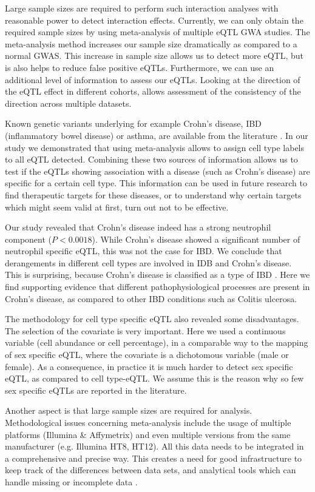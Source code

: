 Large sample sizes are required to perform such interaction analyses with reasonable power to detect interaction effects. Currently, we can only 
obtain the required sample sizes by using meta-analysis of multiple eQTL GWA studies. The meta-analysis method increases our sample size dramatically 
as compared to a normal GWAS. This increase in sample size allows us to detect more eQTL, but is also helps to reduce false positive eQTLs. Furthermore, 
we can use an additional level of information to assess our eQTLs. Looking at the direction of the eQTL effect in different cohorts, allows assessment 
of the consistency of the direction across multiple datasets. 

Known genetic variants underlying for example Crohn's disease, IBD (inflammatory bowel disease) or asthma, are available from the literature 
\cite{Hindorff:2009}. In our study we demonstrated that using meta-analysis allows to assign cell type labels to all eQTL detected. Combining 
these two sources of information allows us to test if the eQTLs showing association with a disease (such as Crohn's disease) are specific for a 
certain cell type. This information can be used in future research to find therapeutic targets for these diseases, or to understand why certain 
targets which might seem valid at first, turn out not to be effective.

Our study revealed that Crohn's disease indeed has a strong neutrophil component ($P < 0.0018$). While Crohn's disease showed a significant number of 
neutrophil specific eQTL, this was not the case for IBD. We conclude that derangements in different cell types are involved in IDB and Crohn's disease. 
This is surprising, because Crohn's disease is classified as a type of IBD \cite{Sandborn:2012}. Here we find supporting evidence that different 
pathophysiological processes are present in Crohn's disease, as compared to other IBD conditions such as Colitis ulcerosa. 

The methodology for cell type specific eQTL also revealed some disadvantages. The selection of the covariate is very important. Here we used a 
continuous variable (cell abundance or cell percentage), in a comparable way to the mapping of sex specific eQTL, where the covariate is a 
dichotomous variable (male or female). As a consequence, in practice it is much harder to detect sex specific eQTL, as compared to cell type-eQTL. 
We assume this is the reason why so few sex specific eQTLs are reported in the literature.

Another aspect is that large sample sizes are required for analysis. Methodological issues concerning meta-analysis include the usage of multiple 
platforms (Illumina \& Affymetrix) and even multiple versions from the same manufacturer (e.g. Illumina HT8, HT12). All this data needs to be 
integrated in a comprehensive and precise way.  This creates a need for good infrastructure to keep track of the differences between data sets, 
and analytical tools which can handle missing or incomplete data \cite{Trelles:2011, Prins:2012}.


